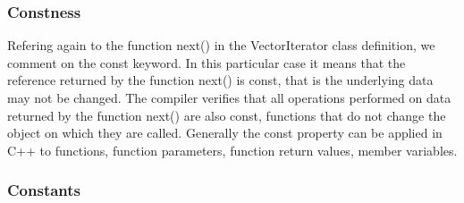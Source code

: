 \subsubsection {Constness}

Refering again to the function next() in the VectorIterator class definition, we comment on the const keyword. In this particular case it means that the reference returned by the function next() is const, that is the underlying data may not be changed. The compiler verifies that all operations performed on data returned by the function next() are also const, functions that do not change the object on which they are called. Generally the const property can be applied in C++ to functions, function parameters, function return values, member variables. 
\subsubsection {Constants}